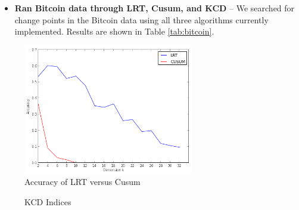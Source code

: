 \documentclass[10pt,letterpaper]{article}
\begin{document}
\begin{itemize}
\item \textbf{Ran Bitcoin data through LRT, Cusum, and KCD} -- We searched for change points in the Bitcoin data using all three algorithms currently implemented. Results are shown in Table \ref{tab:bitcoin}.

\end{itemize}

\begin{figure}[htbp]
\begin{center}
\includegraphics[width=0.66\textwidth]{LrtVCusum.png}
\caption{Accuracy of LRT versus Cusum}
\label{fig:lrtVcusum}
\end{center}
\end{figure}

\begin{figure}[htbp]
    \centering
    \qquad
    \caption{KCD Indices}%
    \label{fig:kcdDiff}%
\end{figure}
\end{document}
